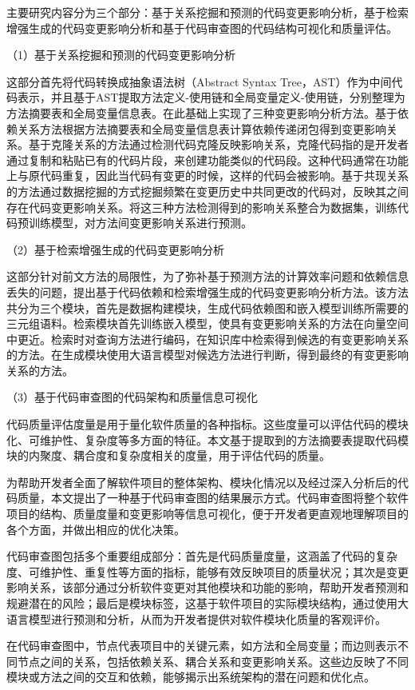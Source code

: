 主要研究内容分为三个部分：基于关系挖掘和预测的代码变更影响分析，基于检索增强生成的代码变更影响分析和基于代码审查图的代码结构可视化和质量评估。

（1）基于关系挖掘和预测的代码变更影响分析

这部分首先将代码转换成抽象语法树（Abstract Syntax Tree，AST）作为中间代码表示，并且基于AST提取方法定义-使用链和全局变量定义-使用链，分别整理为方法摘要表和全局变量信息表。在此基础上实现了三种变更影响分析方法。基于依赖关系方法根据方法摘要表和全局变量信息表计算依赖传递闭包得到变更影响关系。基于克隆关系的方法通过检测代码克隆反映影响关系，克隆代码指的是开发者通过复制和粘贴已有的代码片段，来创建功能类似的代码段。这种代码通常在功能上与原代码重复，因此当代码有变更的时候，这样的代码会被影响。基于共现关系的方法通过数据挖掘的方式挖掘频繁在变更历史中共同更改的代码对，反映其之间存在代码变更影响关系。将这三种方法检测得到的影响关系整合为数据集，训练代码预训练模型，对方法间变更影响关系进行预测。


（2）基于检索增强生成的代码变更影响分析

这部分针对前文方法的局限性，为了弥补基于预测方法的计算效率问题和依赖信息丢失的问题，提出基于代码依赖和检索增强生成的代码变更影响分析方法。该方法共分为三个模块，首先是数据构建模块，生成代码依赖图和嵌入模型训练所需要的三元组语料。检索模块首先训练嵌入模型，使具有变更影响关系的方法在向量空间中更近。检索时对查询方法进行编码，在知识库中检索得到候选的有变更影响关系的方法。在生成模块使用大语言模型对候选方法进行判断，得到最终的有变更影响关系的方法。

（3）基于代码审查图的代码架构和质量信息可视化

代码质量评估度量是用于量化软件质量的各种指标。这些度量可以评估代码的模块化、可维护性、复杂度等多方面的特征。本文基于提取到的方法摘要表提取代码模块的内聚度、耦合度和复杂度相关的度量，用于评估代码的质量。

为帮助开发者全面了解软件项目的整体架构、模块化情况以及经过深入分析后的代码质量，本文提出了一种基于代码审查图的结果展示方式。代码审查图将整个软件项目的结构、质量度量和变更影响等信息可视化，便于开发者更直观地理解项目的各个方面，并做出相应的优化决策。

代码审查图包括多个重要组成部分：首先是代码质量度量，这涵盖了代码的复杂度、可维护性、重复性等方面的指标，能够有效反映项目的质量状况；其次是变更影响关系，该部分通过分析软件变更对其他模块和功能的影响，帮助开发者预测和规避潜在的风险；最后是模块标签，这基于软件项目的实际模块结构，通过使用大语言模型进行预测和分析，从而为开发者提供对软件模块化质量的客观评价。

在代码审查图中，节点代表项目中的关键元素，如方法和全局变量；而边则表示不同节点之间的关系，包括依赖关系、耦合关系和变更影响关系。这些边反映了不同模块或方法之间的交互和依赖，能够揭示出系统架构的潜在问题和优化点。

